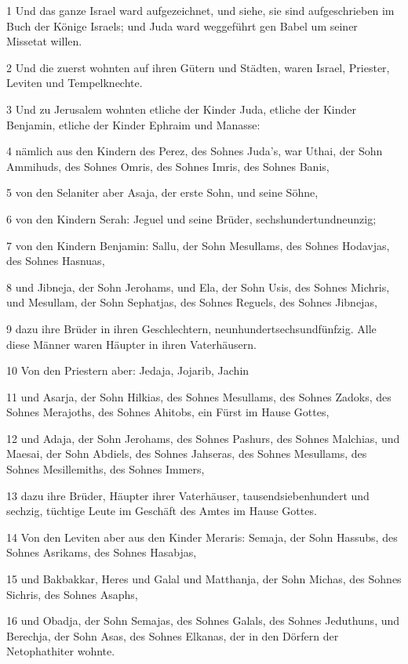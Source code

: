 \par 1 Und das ganze Israel ward aufgezeichnet, und siehe, sie sind aufgeschrieben im Buch der Könige Israels; und Juda ward weggeführt gen Babel um seiner Missetat willen.
\par 2 Und die zuerst wohnten auf ihren Gütern und Städten, waren Israel, Priester, Leviten und Tempelknechte.
\par 3 Und zu Jerusalem wohnten etliche der Kinder Juda, etliche der Kinder Benjamin, etliche der Kinder Ephraim und Manasse:
\par 4 nämlich aus den Kindern des Perez, des Sohnes Juda's, war Uthai, der Sohn Ammihuds, des Sohnes Omris, des Sohnes Imris, des Sohnes Banis,
\par 5 von den Selaniter aber Asaja, der erste Sohn, und seine Söhne,
\par 6 von den Kindern Serah: Jeguel und seine Brüder, sechshundertundneunzig;
\par 7 von den Kindern Benjamin: Sallu, der Sohn Mesullams, des Sohnes Hodavjas, des Sohnes Hasnuas,
\par 8 und Jibneja, der Sohn Jerohams, und Ela, der Sohn Usis, des Sohnes Michris, und Mesullam, der Sohn Sephatjas, des Sohnes Reguels, des Sohnes Jibnejas,
\par 9 dazu ihre Brüder in ihren Geschlechtern, neunhundertsechsundfünfzig. Alle diese Männer waren Häupter in ihren Vaterhäusern.
\par 10 Von den Priestern aber: Jedaja, Jojarib, Jachin
\par 11 und Asarja, der Sohn Hilkias, des Sohnes Mesullams, des Sohnes Zadoks, des Sohnes Merajoths, des Sohnes Ahitobs, ein Fürst im Hause Gottes,
\par 12 und Adaja, der Sohn Jerohams, des Sohnes Pashurs, des Sohnes Malchias, und Maesai, der Sohn Abdiels, des Sohnes Jahseras, des Sohnes Mesullams, des Sohnes Mesillemiths, des Sohnes Immers,
\par 13 dazu ihre Brüder, Häupter ihrer Vaterhäuser, tausendsiebenhundert und sechzig, tüchtige Leute im Geschäft des Amtes im Hause Gottes.
\par 14 Von den Leviten aber aus den Kinder Meraris: Semaja, der Sohn Hassubs, des Sohnes Asrikams, des Sohnes Hasabjas,
\par 15 und Bakbakkar, Heres und Galal und Matthanja, der Sohn Michas, des Sohnes Sichris, des Sohnes Asaphs,
\par 16 und Obadja, der Sohn Semajas, des Sohnes Galals, des Sohnes Jeduthuns, und Berechja, der Sohn Asas, des Sohnes Elkanas, der in den Dörfern der Netophathiter wohnte.
